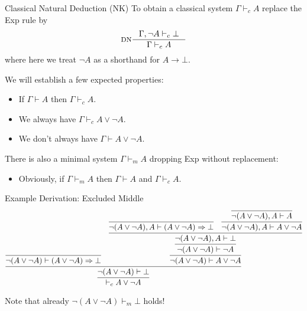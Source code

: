 \documentclass[xcolor=dvipsnames,aspectratio=169,handout]{beamer}
\begin{document}
\begin{frame}{Classical Natural Deduction (NK)}
	To obtain a classical system $\Gamma\vdash_c A$ replace the Exp rule by
	$$\inference[DN]{\Gamma,\neg A\vdash_c\bot}{\Gamma\vdash_c A}$$
	where here we treat $\neg A$ as a shorthand for $A\to \bot$.
	
	\pause
	
	\vspace{0.5cm}
	We will establish a few expected properties:
	\begin{itemize}
		\item
		If $\Gamma\vdash A$ then $\Gamma\vdash_c A$.
		\item
		We always have $\Gamma\vdash_c A\lor\neg A$.
		\item
		We don't always have $\Gamma\vdash A\lor\neg A$.
	\end{itemize}
	
	\pause
	
	\vspace{0.5cm}
	There is also a minimal system $\Gamma \vdash_m A$ dropping Exp without replacement:
	\begin{itemize}
		\item
		Obviously, if $\Gamma\vdash_m A$ then $\Gamma\vdash A$ and $\Gamma\vdash_c A$.
	\end{itemize}
\end{frame}

\begin{frame}{Example Derivation: Excluded Middle}
	\pause
	$$
	\infer{\vdash_c A\lor\neg A}{
	\infer{\neg( A\lor \neg A)\vdash\bot}{
	\infer{\neg( A\lor \neg A)\vdash (A\lor \neg A)\to \bot}{} &
	\infer{\neg( A\lor \neg A)\vdash A\lor \neg A}{
	\infer{\neg( A\lor \neg A)\vdash \neg A}{
	\infer{\neg( A\lor \neg A),A\vdash \bot}{
	\infer{\neg( A\lor \neg A),A\vdash (A\lor \neg A)\to \bot}{} &
	\infer{\neg( A\lor \neg A),A\vdash A\lor\neg A}{
	\infer{\neg( A\lor \neg A),A\vdash A}{}
	}}}}}}
	$$
	
	\pause
	\vspace{0.5cm}
	Note that already $\neg( A\lor \neg A)\vdash_m \bot$ holds!
\end{frame}
\end{document}
